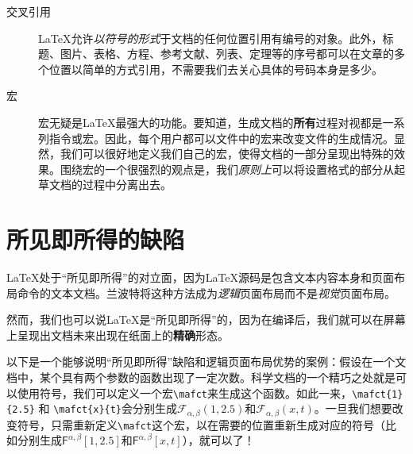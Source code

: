 \begin{description}

\item[交叉引用]\LaTeX 允许\emph{以符号的形式}于文档的任何位置引用有编号的对象。此外，标题、图片、表格、方程、参考文献、列表、定理等的序号都可以在文章的多个位置以简单的方式引用，不需要我们去关心具体的号码本身是多少。

\item[宏]宏无疑是\LaTeX 最强大的功能。要知道，生成文档的\textbf{所有}过程对视都是一系列指令或宏。因此，每个用户都可以文件中的宏来改变文件的生成情况。显然，我们可以很好地定义我们自己的宏，使得文档的一部分呈现出特殊的效果。围绕宏的一个很强烈的观点是，我们\emph{原则上}可以将设置格式的部分从起草文档的过程中分离出去。

\end{description}

\section*{所见即所得的缺陷}

\LaTeX 处于“所见即所得”的对立面，因为\LaTeX 源码是包含文本内容本身和页面布局命令的文本文档。兰波特将这种方法成为\emph{逻辑}页面布局而不是\emph{视觉}页面布局。

然而，我们也可以说\LaTeX 是“所见即所得”的，因为在编译后，我们就可以在屏幕上呈现出文档未来出现在纸面上的\textbf{精确}形态。

以下是一个能够说明“所见即所得”缺陷和逻辑页面布局优势的案例：假设在一个文档中，某个具有两个参数的函数出现了一定次数。科学文档的一个精巧之处就是可以使用符号，我们可以定义一个宏\texttt{\backslash mafct}来生成这个函数。如此一来，\texttt{\backslash mafct\{1\}\{2.5\}} 和 \texttt{\backslash mafct\{x\}\{t\}}会分别生成$\mathcal{F}_{\alpha, \beta}(1, 2.5)$和$\mathcal{F}_{\alpha, \beta}(x, t)$。一旦我们想要改变符号，只需重新定义\texttt{\backslash mafct}这个宏，以在需要的位置重新生成对应的符号（比如分别生成$\mathsf{F}^{\alpha, \beta}[1, 2.5]$和$\mathsf{F}^{\alpha, \beta}[x, t]$），就可以了！

